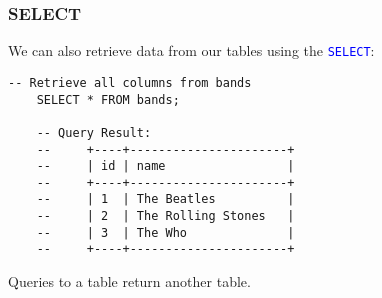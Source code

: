 \subsubsection*{SELECT}

We can also retrieve data from our tables using the \textcolor{blue}{\texttt{SELECT}}:

\begin{lstlisting}[style=sql]
    -- Retrieve all columns from bands
    SELECT * FROM bands;

    -- Query Result:
    --     +----+----------------------+
    --     | id | name                 |
    --     +----+----------------------+
    --     | 1  | The Beatles          |
    --     | 2  | The Rolling Stones   |
    --     | 3  | The Who              |
    --     +----+----------------------+
\end{lstlisting}

\noindent
Queries to a table return another table.

\newpage

